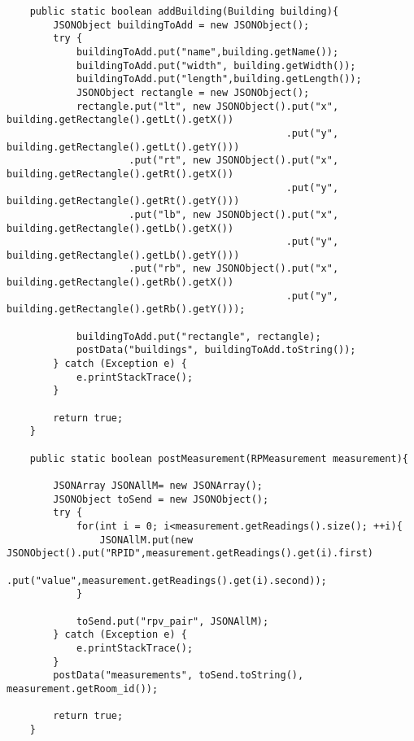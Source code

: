 \begin{lstlisting}
    public static boolean addBuilding(Building building){
        JSONObject buildingToAdd = new JSONObject();
        try {
            buildingToAdd.put("name",building.getName());
            buildingToAdd.put("width", building.getWidth());
            buildingToAdd.put("length",building.getLength());
            JSONObject rectangle = new JSONObject();
            rectangle.put("lt", new JSONObject().put("x", building.getRectangle().getLt().getX())
                                                .put("y", building.getRectangle().getLt().getY()))
                     .put("rt", new JSONObject().put("x", building.getRectangle().getRt().getX())
                                                .put("y", building.getRectangle().getRt().getY()))
                     .put("lb", new JSONObject().put("x", building.getRectangle().getLb().getX())
                                                .put("y", building.getRectangle().getLb().getY()))
                     .put("rb", new JSONObject().put("x", building.getRectangle().getRb().getX())
                                                .put("y", building.getRectangle().getRb().getY()));

            buildingToAdd.put("rectangle", rectangle);
            postData("buildings", buildingToAdd.toString());
        } catch (Exception e) {
            e.printStackTrace();
        }

        return true;
    }

    public static boolean postMeasurement(RPMeasurement measurement){

        JSONArray JSONAllM= new JSONArray();
        JSONObject toSend = new JSONObject();
        try {
            for(int i = 0; i<measurement.getReadings().size(); ++i){
                JSONAllM.put(new JSONObject().put("RPID",measurement.getReadings().get(i).first)
                        .put("value",measurement.getReadings().get(i).second));
            }

            toSend.put("rpv_pair", JSONAllM);
        } catch (Exception e) {
            e.printStackTrace();
        }
        postData("measurements", toSend.toString(), measurement.getRoom_id());

        return true;
    }


\end{lstlisting}

